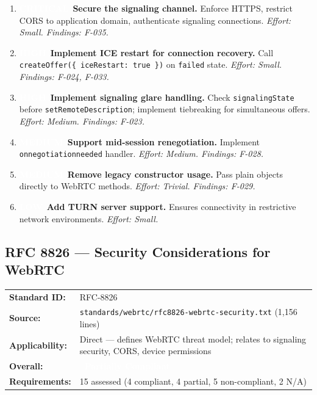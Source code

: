 \documentclass[11pt,letterpaper]{article}
\newcommand{\partiallycompliant}{\colorbox{noncompliant}{\textcolor{white}{\textbf{\small~Partially Compliant~}}}}
\newcommand{\pricritical}{\colorbox{critical}{\textcolor{white}{\small\textbf{CRITICAL}}}}
\newcommand{\prihigh}{\colorbox{major}{\textcolor{white}{\small\textbf{HIGH}}}}
\newcommand{\primedium}{\colorbox{minor!80!black}{\textcolor{white}{\small\textbf{MEDIUM}}}}
\newcommand{\prilow}{\colorbox{notapplicable}{\textcolor{white}{\small\textbf{LOW}}}}
\begin{document}
\begin{enumerate}[leftmargin=2em]
    \item \pricritical\ \textbf{Secure the signaling channel.} Enforce HTTPS, restrict CORS to application domain, authenticate signaling connections. \textit{Effort: Small. Findings: F-035.}
    \item \prihigh\ \textbf{Implement ICE restart for connection recovery.} Call \texttt{createOffer(\{ iceRestart: true \})} on \texttt{failed} state. \textit{Effort: Small. Findings: F-024, F-033.}
    \item \prihigh\ \textbf{Implement signaling glare handling.} Check \texttt{signalingState} before \texttt{setRemoteDescription}; implement tiebreaking for simultaneous offers. \textit{Effort: Medium. Findings: F-023.}
    \item \primedium\ \textbf{Support mid-session renegotiation.} Implement \texttt{onnegotiationneeded} handler. \textit{Effort: Medium. Findings: F-028.}
    \item \primedium\ \textbf{Remove legacy constructor usage.} Pass plain objects directly to WebRTC methods. \textit{Effort: Trivial. Findings: F-029.}
    \item \prilow\ \textbf{Add TURN server support.} Ensures connectivity in restrictive network environments. \textit{Effort: Small.}
\end{enumerate}

\newpage

\subsection{RFC 8826 --- Security Considerations for WebRTC}

\begin{tabular}{ll}
\textbf{Standard ID:} & RFC-8826 \\
\textbf{Source:} & \texttt{standards/webrtc/rfc8826-webrtc-security.txt} (1,156 lines) \\
\textbf{Applicability:} & Direct --- defines WebRTC threat model; relates to signaling security, CORS, device permissions \\
\textbf{Overall:} & \partiallycompliant \\
\textbf{Requirements:} & 15 assessed (4 compliant, 4 partial, 5 non-compliant, 2 N/A) \\
\end{tabular}
\end{document}
